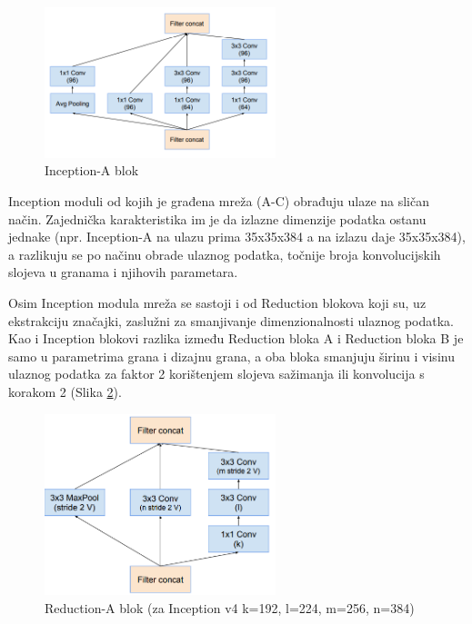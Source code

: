 \documentclass[times, utf8, proizvoljni, numeric]{fer}
\begin{document}
\begin{figure}[H]
	\begin{center}
		\captionsetup{justification=centering}
		\includegraphics[width=0.6\textwidth]{./imgs/inception_blok_a.png}
		\caption{Inception-A blok  \cite{Inceptionv4}}
		\label{fg:inception_blok_a}
	\end{center}
\end{figure}

Inception moduli od kojih je građena mreža (A-C) obrađuju ulaze na sličan način. Zajednička karakteristika im je da izlazne dimenzije podatka ostanu jednake (npr. Inception-A na ulazu prima 35x35x384 a na izlazu daje 35x35x384), a razlikuju se po načinu obrade ulaznog podatka, točnije broja konvolucijskih slojeva u granama i njihovih parametara.

Osim Inception modula mreža se sastoji i od Reduction blokova koji su, uz ekstrakciju značajki, zaslužni za smanjivanje dimenzionalnosti ulaznog podatka. Kao i Inception blokovi razlika između Reduction bloka A i Reduction bloka B je samo u parametrima grana i dizajnu grana, a oba bloka smanjuju širinu i visinu ulaznog podatka za faktor 2 korištenjem slojeva sažimanja ili konvolucija s korakom 2 (Slika \ref{fg:inception_reduction_a}).

\begin{figure}[!ht]
	\begin{center}
		\captionsetup{justification=centering}
		\includegraphics[width=0.6\textwidth]{./imgs/inception_reduction_a.png}
		\caption{Reduction-A blok (za Inception v4 k=192, l=224, m=256, n=384) \cite{Inceptionv4}}
		\label{fg:inception_reduction_a}
	\end{center}
\end{figure}
\end{document}

